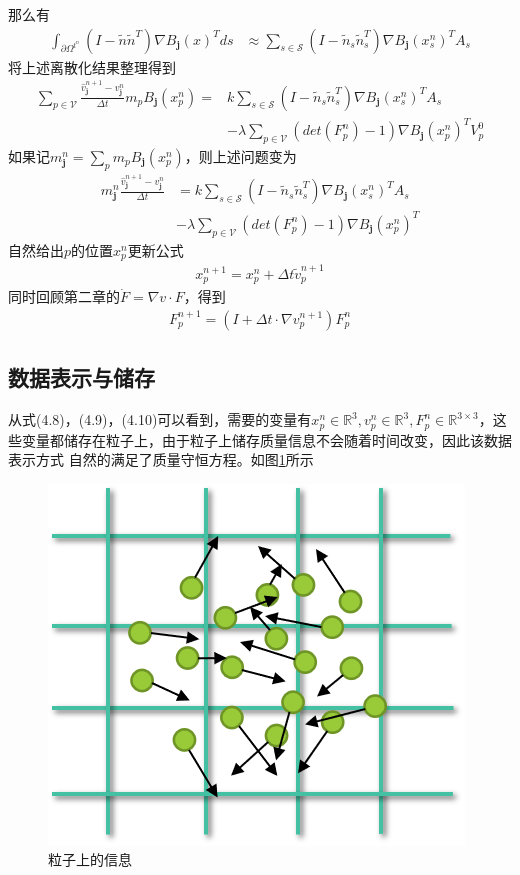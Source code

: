 那么有
\begin{align}
    \int_{\partial \Omega^{t^n}} (I - \tilde{n}\tilde{n}^T)\nabla B_{\mathbf{j}}(x)^T ds &\approx \sum_{s\in\mathcal{S}}(I - \tilde{n}_s\tilde{n}_s^T)\nabla B_{\mathbf{j}}(x_s^n)^TA_s
\end{align}
将上述离散化结果整理得到
\begin{align}
    \sum_{p\in \mathcal{V}} \frac{\hat{v}^{n+1}_\mathbf{j} - v^n_{\mathbf{j}}}{\Delta t}m_pB_{\mathbf{j}}(x_p^n) = &k\sum_{s\in\mathcal{S}}(I - \tilde{n}_s\tilde{n}_s^T)\nabla B_{\mathbf{j}}(x_s^n)^TA_s\nonumber\\
    & - \lambda \sum_{p\in\mathcal{V}} (det(F_p^n) - 1)\nabla B_{\mathbf{j}}(x_p^n)^T V_p^0
\end{align}
如果记$m_{\mathbf{j}}^n = \sum_p m_p B_{\mathbf{j}}(x_p^n)$，则上述问题变为
\begin{align}
    m_\mathbf{j}^n \frac{\hat{v}^{n+1}_\mathbf{j} - v^n_{\mathbf{j}}}{\Delta t} &= k\sum_{s\in \mathcal{S}}(I - \tilde{n}_s\tilde{n}_s^T)\nabla B_\mathbf{j}(x_s^n)^TA_s\nonumber\\
    & - \lambda \sum_{p\in\mathcal{V}} (det(F_p^n) - 1)\nabla B_{\mathbf{j}}(x_p^n)^T 
\end{align}
自然给出$p$的位置$x_p^n$更新公式
\begin{align}    
    x_p^{n+1} = x_p^n + \Delta t \tilde{v}_p^{n+1}
\end{align}
同时回顾第二章的$\dot{F} = \nabla v \cdot F$，得到
\begin{align}
    F^{n+1}_p = (I + \Delta t\cdot \nabla {v}^{n+1}_p)F^n_p
\end{align}

\subsection{数据表示与储存}
从式(4.8)，(4.9)，(4.10)可以看到，需要的变量有$x_p^n\in \mathbb{R}^3,v_p^{n}\in \mathbb{R}^3,F_p^n\in \mathbb{R}^{3\times 3}$，这些变量都储存在粒子上，由于粒子上储存质量信息不会随着时间改变，因此该数据表示方式
自然的满足了质量守恒方程。如图\ref{fig: particle information}所示
\begin{figure}[htbp]
    \centering
    \includegraphics[scale=0.7]{./images/image13.png}
    \caption{粒子上的信息}
    \label{fig: particle information}
\end{figure}

